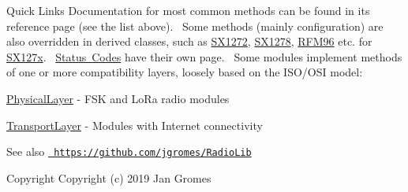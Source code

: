 \begin{DoxyParagraph}{Quick Links}
Documentation for most common methods can be found in its reference page (see the list above).~\newline
Some methods (mainly configuration) are also overridden in derived classes, such as \mbox{\hyperlink{class_s_x1272}{S\+X1272}}, \mbox{\hyperlink{class_s_x1278}{S\+X1278}}, \mbox{\hyperlink{class_r_f_m96}{R\+F\+M96}} etc. for \mbox{\hyperlink{class_s_x127x}{S\+X127x}}.~\newline
\mbox{\hyperlink{group__status__codes}{Status Codes}} have their own page.~\newline
Some modules implement methods of one or more compatibility layers, loosely based on the I\+S\+O/\+O\+SI model\+:
\begin{DoxyItemize}
\item \mbox{\hyperlink{class_physical_layer}{Physical\+Layer}} -\/ F\+SK and Lo\+Ra radio modules
\item \mbox{\hyperlink{class_transport_layer}{Transport\+Layer}} -\/ Modules with Internet connectivity
\end{DoxyItemize}
\end{DoxyParagraph}
\begin{DoxySeeAlso}{See also}
\href{https://github.com/jgromes/RadioLib}{\texttt{ https\+://github.\+com/jgromes/\+Radio\+Lib}}
\end{DoxySeeAlso}
\begin{DoxyCopyright}{Copyright}
Copyright (c) 2019 Jan Gromes 
\end{DoxyCopyright}
